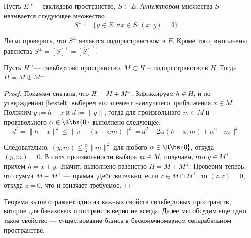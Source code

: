 \begin{definition}
	Пусть $E$ "--- евклидово пространство, $S \subset E$. \textit{Аннулятором} множества $S$ называется следующее множество:
	\[S^\perp := \{y \in E: \forall x \in S: (x, y) = 0\}\]
\end{definition}

\begin{note}
	Легко проверить, что $S^\perp$ является подпространством в $E$. Кроме того, выполнены равенства $S^\perp = [S]^\perp = \overline{[S]}^\perp$.
\end{note}

\begin{theorem}\label{thm4.3}
	Пусть $H$ "--- гильбертово пространство, {$M \subset H$} -- подпространство в $H$. Тогда $H = M \oplus M^\perp$.
\end{theorem}

\begin{proof}
	Покажем сначала, что $H = M + M^\perp$. Зафиксируем $h \in H$, и по утверждению \ref{bestelt} выберем его элемент наилучшего приближения $x \in M$. Положим $y := h - x$ и $d := \|y\|$, тогда для произвольного $m \in M$ и произвольного $\alpha \in \R \bs \{0\}$ выполнено следующее:
	\[d^2 = \|h - x\|^2 \leqslant \|h - (x + \alpha m)\|^2 = d^2 - 2\alpha(h - x, m) + \alpha^2\|m\|^2\]

	Следовательно, $(y, m) \leqslant \frac\alpha2\|m\|^2$ для любого $\alpha \in \R \bs \{0\}$, откуда $(y, m) = 0$. В силу произвольности выбора $m \in M$, получаем, что $y \in M^\perp$, причем $h = x + y$. Значит, выполнено равенство $H = M + M^\perp$. Проверим теперь, что сумма $M + M^\perp$ --- прямая. Действительно, если $z \in M \cap M^\perp$, то $(z, z) = 0$, откуда $z = 0$, что и означает требуемое.
\end{proof}

\begin{note}
	Теорема выше отражает одно из важных свойств гильбертовых пространств, которое для банаховых пространств верно не всегда. Далее мы обсудим еще одно такое свойство --- существование базиса в бесконечномерном сепарабельном пространстве.
\end{note}